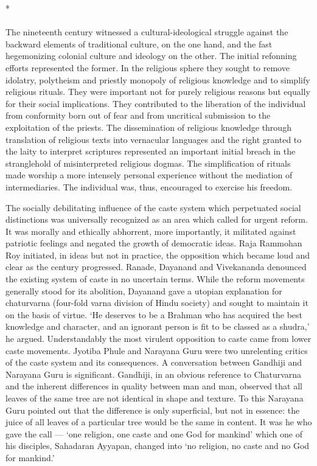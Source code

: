 \begin{center}*\end{center}

\paragraph*{}


The nineteenth century witnessed a cultural-ideological struggle against the backward elements of traditional culture, on the one hand, and the fast hegemonizing colonial culture and ideology on the other. The initial refonning efforts represented the former. In the religious sphere they sought to remove idolatry, polytheism and priestly monopoly of religious knowledge and to simplify religious rituals. They were important not for purely religious reasons but equally for their social implications. They contributed to the liberation of the individual from conformity born out of fear and from uncritical submission to the exploitation of the priests. The dissemination of religious knowledge through translation of religious texts into vernacular languages and the right granted to the laity to interpret scriptures represented an important initial breach in the stranglehold of misinterpreted religious dogmas. The simplification of rituals made worship a more intensely personal experience without the mediation of intermediaries. The individual was, thus, encouraged to exercise his freedom.

The socially debilitating influence of the caste system which perpetuated social distinctions was universally recognized as an area which called for urgent reform. It was morally and ethically abhorrent, more importantly, it militated against patriotic feelings and negated the growth of democratic ideas. Raja Rammohan Roy initiated, in ideas but not in practice, the opposition which became loud and clear as the century progressed. Ranade, Dayanand and Vivekananda denounced the existing system of caste in no uncertain terms. While the reform movements generally stood for its abolition, Dayanand gave a utopian explanation for chaturvarna (four-fold varna division of Hindu society) and sought to maintain it on the basis of virtue. `He deserves to be a Brahman who has acquired the best knowledge and character, and an ignorant person is fit to be classed as a shudra,' he argued. Understandably the most virulent opposition to caste came from lower caste movements. Jyotiba Phule and Narayana Guru were two unrelenting critics of the caste system and its consequences. A conversation between Gandhiji and Narayana Guru is significant. Gandhiji, in an obvious reference to Chaturvarna and the inherent differences in quality between man and man, observed that all leaves of the same tree are not identical in shape and texture. To this Narayana Guru pointed out that the difference is only superficial, but not in essence: the juice of all leaves of a particular tree would be the same in content. It was he who gave the call — `one religion, one caste and one God for mankind' which one of his disciples, Sahadaran Ayyapan, changed into `no religion, no caste and no God for mankind.'

